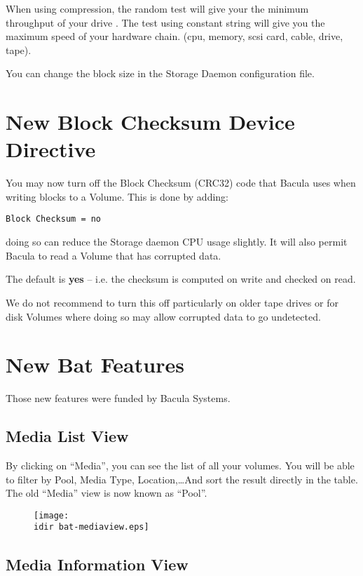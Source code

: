 When using compression, the random test will give your the minimum throughput
of your drive . The test using constant string will give you the maximum speed
of your hardware chain. (cpu, memory, scsi card, cable, drive, tape).

You can change the block size in the Storage Daemon configuration file.

\section{New {\bf Block Checksum} Device Directive}
You may now turn off the Block Checksum (CRC32) code
that Bacula uses when writing blocks to a Volume.  This is
done by adding:

\begin{verbatim}
Block Checksum = no
\end{verbatim}

doing so can reduce the Storage daemon CPU usage slightly.  It
will also permit Bacula to read a Volume that has corrupted data.

The default is {\bf yes} -- i.e. the checksum is computed on write
and checked on read. 

We do not recommend to turn this off particularly on older tape
drives or for disk Volumes where doing so may allow corrupted data
to go undetected.

\section{New Bat Features}

Those new features were funded by Bacula Systems.

\subsection{Media List View}

By clicking on ``Media'', you can see the list of all your volumes. You will be
able to filter by Pool, Media Type, Location,\dots And sort the result directly
in the table. The old ``Media'' view is now known as ``Pool''.
\begin{figure}[htbp]
  \centering
  \texttt{[image: \\idir bat-mediaview.eps]}
  \label{fig:mediaview}
\end{figure}


\subsection{Media Information View}


